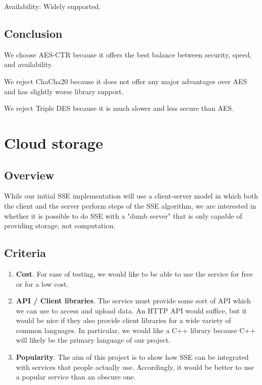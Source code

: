 Availability: Widely supported.

\subsection{ Conclusion }

We choose AES-CTR because it offers the best balance between security, speed, and availability.

We reject ChaCha20 because it does not offer any major advantages over AES and has slightly worse library support.

We reject Triple DES because it is much slower and less secure than AES.

\section{ Cloud storage }

\subsection{ Overview }

While our initial SSE implementation will use a client-server model in which both the client and the server perform steps of the SSE algorithm, we are interested in whether it is possible to do SSE with a "dumb server" that is only capable of providing storage, not computation.

\subsection{ Criteria }

\begin{enumerate}
  \item \textbf{Cost}.
  For ease of testing, we would like to be able to use the service for free or for a low cost.

  \item \textbf{API / Client libraries}.
  The service must provide some sort of API which we can use to access and upload data. An HTTP API would suffice, but it would be nice if they also provide client libraries for a wide variety of common languages. In particular, we would like a C++ library because C++ will likely be the primary language of our project.

  \item \textbf{Popularity}.
  The aim of this project is to show how SSE can be integrated with services that people actually use.
  Accordingly, it would be better to use a popular service than an obscure one.
\end{enumerate}

